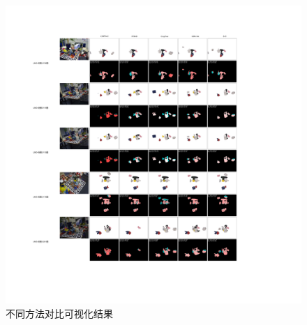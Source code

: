 \begin{figure}
  \centering
  \includegraphics[width=1\linewidth]{figure/hipose/compare_visualize.pdf}
  \caption{不同方法对比可视化结果}
  \label{fig:Qualitative_different_methods}
\end{figure}